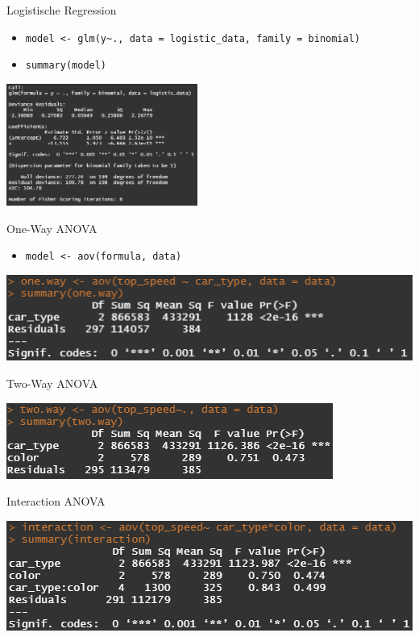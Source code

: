 \documentclass[xcolor=dvipsnames, aspectratio = 169]{beamer}
\begin{document}
\begin{frame}[fragile]{Logistische Regression}
	\begin{itemize}
		\item \verb+model <- glm(y~., data = logistic_data, family = binomial)+
		\item \verb+summary(model)+
	\end{itemize}
			
	\begin{center}
		\includegraphics[height=4cm]{LogisticRegressionSummary}
	\end{center}
\end{frame}

\begin{frame}[fragile]{One-Way ANOVA}
	\begin{itemize}
		\item \verb+model <- aov(formula, data)+
	\end{itemize}	
	\begin{center}
		\includegraphics{OneWay}
	\end{center}
\end{frame}

\begin{frame}[fragile]{Two-Way ANOVA}
	\begin{center}
		\includegraphics{TwoWay}
	\end{center}
\end{frame}

\begin{frame}[fragile]{Interaction ANOVA}
	\begin{center}
		\includegraphics{Interaction}
	\end{center}
\end{frame}
\end{document}
